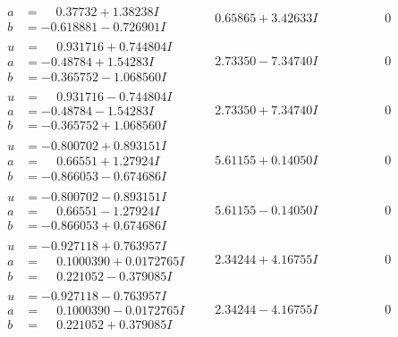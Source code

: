 \documentclass[1p]{elsarticle_modified}
\theoremstyle{definition}
\begin{document}
$$\begin{array}{c|c|c}
\begin{aligned}
a &= \phantom{-}0.37732 + 1.38238 I \\
b &= -0.618881 - 0.726901 I\end{aligned}
 & \phantom{-}0.65865 + 3.42633 I & \phantom{-0.000000 } 0 \\ \hline\begin{aligned}
u &= \phantom{-}0.931716 + 0.744804 I \\
a &= -0.48784 + 1.54283 I \\
b &= -0.365752 - 1.068560 I\end{aligned}
 & \phantom{-}2.73350 - 7.34740 I & \phantom{-0.000000 } 0 \\ \hline\begin{aligned}
u &= \phantom{-}0.931716 - 0.744804 I \\
a &= -0.48784 - 1.54283 I \\
b &= -0.365752 + 1.068560 I\end{aligned}
 & \phantom{-}2.73350 + 7.34740 I & \phantom{-0.000000 } 0 \\ \hline\begin{aligned}
u &= -0.800702 + 0.893151 I \\
a &= \phantom{-}0.66551 + 1.27924 I \\
b &= -0.866053 - 0.674686 I\end{aligned}
 & \phantom{-}5.61155 + 0.14050 I & \phantom{-0.000000 } 0 \\ \hline\begin{aligned}
u &= -0.800702 - 0.893151 I \\
a &= \phantom{-}0.66551 - 1.27924 I \\
b &= -0.866053 + 0.674686 I\end{aligned}
 & \phantom{-}5.61155 - 0.14050 I & \phantom{-0.000000 } 0 \\ \hline\begin{aligned}
u &= -0.927118 + 0.763957 I \\
a &= \phantom{-}0.1000390 + 0.0172765 I \\
b &= \phantom{-}0.221052 - 0.379085 I\end{aligned}
 & \phantom{-}2.34244 + 4.16755 I & \phantom{-0.000000 } 0 \\ \hline\begin{aligned}
u &= -0.927118 - 0.763957 I \\
a &= \phantom{-}0.1000390 - 0.0172765 I \\
b &= \phantom{-}0.221052 + 0.379085 I\end{aligned}
 & \phantom{-}2.34244 - 4.16755 I & \phantom{-0.000000 } 0 \\ \hline\begin{aligned}

\end{aligned}
\end{array}$$
\end{document}
